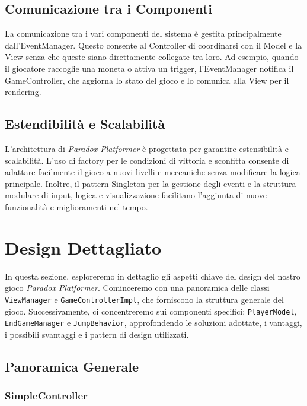 \documentclass[a4paper,12pt]{report}
\begin{document}
	\subsection{Comunicazione tra i Componenti}
	
	La comunicazione tra i vari componenti del sistema è gestita principalmente dall'EventManager. Questo consente al Controller di coordinarsi con il Model e la View senza che queste siano direttamente collegate tra loro. Ad esempio, quando il giocatore raccoglie una moneta o attiva un trigger, l'EventManager notifica il GameController, che aggiorna lo stato del gioco e lo comunica alla View per il rendering.
	
	\subsection{Estendibilità e Scalabilità}
	
	L'architettura di \textit{Paradox Platformer} è progettata per garantire estensibilità e scalabilità. L’uso di factory per le condizioni di vittoria e sconfitta consente di adattare facilmente il gioco a nuovi livelli e meccaniche senza modificare la logica principale. Inoltre, il pattern Singleton per la gestione degli eventi e la struttura modulare di input, logica e visualizzazione facilitano l'aggiunta di nuove funzionalità e miglioramenti nel tempo.

	
	\section{Design Dettagliato}
	
	In questa sezione, esploreremo in dettaglio gli aspetti chiave del design del nostro gioco \textit{Paradox Platformer}. Cominceremo con una panoramica delle classi \texttt{ViewManager} e \texttt{GameControllerImpl}, che forniscono la struttura generale del gioco. Successivamente, ci concentreremo sui componenti specifici: \texttt{PlayerModel}, \texttt{EndGameManager} e \texttt{JumpBehavior}, approfondendo le soluzioni adottate, i vantaggi, i possibili svantaggi e i pattern di design utilizzati.
	
	\subsection{Panoramica Generale}
	
	\subsubsection{SimpleController}
	
\end{document}
